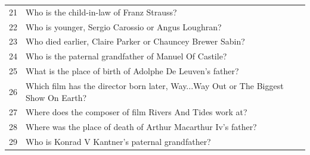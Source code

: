 \begin{tabular}{ll}
21 & Who is the child-in-law of Franz Strauss? \\
22 & Who is younger, Sergio Carossio or Angus Loughran? \\
23 & Who died earlier, Claire Parker or Chauncey Brewer Sabin? \\
24 & Who is the paternal grandfather of Manuel Of Castile? \\
25 & What is the place of birth of Adolphe De Leuven's father? \\
26 & Which film has the director born later, Way...Way Out or The Biggest Show On Earth? \\
27 & Where does the composer of film Rivers And Tides work at? \\
28 & Where was the place of death of Arthur Macarthur Iv's father? \\
29 & Who is Konrad V Kantner's paternal grandfather? \\
\bottomrule
\end{tabular}
